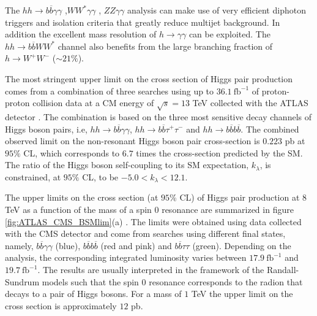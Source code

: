 The $hh\rightarrow b\overline{b}\gamma\gamma$ \cite{hhbbAA_CMS,hhAAbb_ATLAS},$WW^*\gamma\gamma$ \cite{hhATLAS,hhbbll_CMS}, $ZZ\gamma\gamma$ \cite{hhbbll_CMS} analysis can make use of very efficient diphoton triggers and isolation criteria that greatly reduce multijet background. In addition the excellent mass resolution of $h\rightarrow \gamma\gamma$ can be exploited. The $hh\rightarrow b\overline{b}WW^*$ channel also benefits from the large branching fraction of $h\rightarrow W^+W^-$ ($\sim 21 \%$).


The most stringent upper limit on the cross section of Higgs pair production comes from a combination of three searches using up to $36.1~\text{fb}^{-1}$ of proton-proton collision data at a CM energy of $\sqrt{s}=13$ TeV collected with the ATLAS detector \cite{ATLAShhComb}. The combination is based on the three most sensitive decay channels of Higgs boson pairs, i.e, $hh\rightarrow b\overline{b}\gamma\gamma$, $hh\rightarrow b\overline{b}\tau^+\tau^-$ and $hh\rightarrow b\overline{b}b\overline{b}$. The combined observed
limit on the non-resonant Higgs boson pair cross-section is $0.223$ pb at $95\%$ CL,
which corresponds to $6.7$ times the cross-section predicted by the SM. The ratio of the Higgs boson self-coupling to its SM expectation, $k_{\lambda}$, is constrained, at $95\%$ CL, to be $-5.0<k_{\lambda}<12.1$.

The upper limits on the cross section (at $95$\% CL) of Higgs pair production at $8$ TeV as a function of the mass of a spin 0 resonance are summarized in figure \ref{fig:ATLAS_CMS_BSMlim}(a) \cite{hhbbAA_CMS}. The limits were obtained using data collected with the CMS detector and come from searches using different final states, namely, $b\overline{b}\gamma\gamma$ (blue), $b\overline{b}b\overline{b}$ (red and pink) and $b\overline{b}\tau\tau$ (green). Depending on the analysis, the corresponding integrated luminosity varies between $17.9~\text{fb}^{-1}$ and $19.7~\text{fb}^{-1}$. The results are usually interpreted in the framework of the Randall-Sundrum models such that the spin 0 resonance corresponds to the radion that decays to a pair of Higgs bosons. For a mass of $1$ TeV the upper limit on the cross section is approximately $12$ pb.

